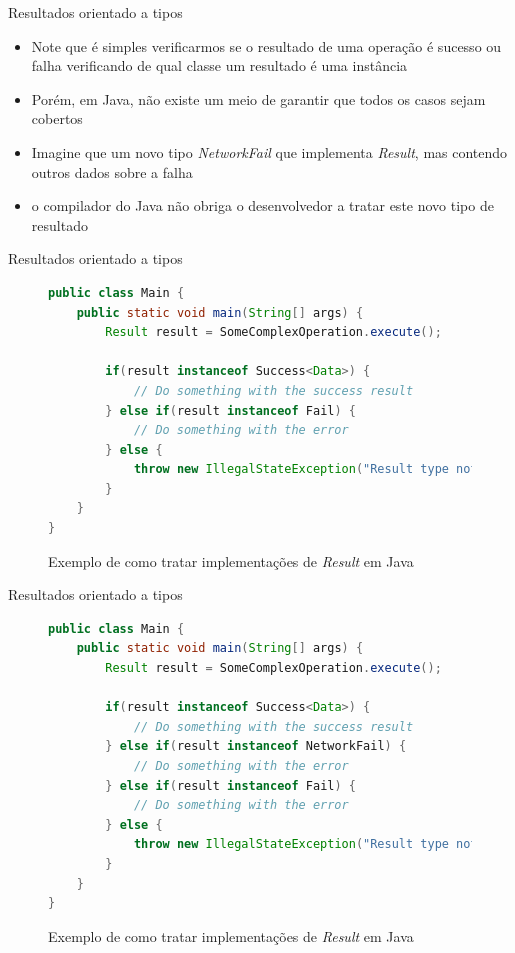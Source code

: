 \documentclass[brazilian]{beamer}
\begin{document}
\begin{frame}{Resultados orientado a tipos}
    \begin{itemize}
        \item Note que é simples verificarmos se o resultado de uma operação é sucesso ou falha verificando de qual classe um resultado é uma instância
        \item Porém, em Java, não existe um meio de garantir que todos os casos sejam cobertos
        \item Imagine que um novo tipo \emph{NetworkFail} que implementa \emph{Result}, mas contendo outros dados sobre a falha
        \item o compilador do Java não obriga o desenvolvedor a tratar este novo tipo de resultado
    \end{itemize}
\end{frame}

\begin{frame}[fragile]{Resultados orientado a tipos}
    \begin{figure}[H]
        \centering
        \begin{lstlisting}[language=Java]
public class Main {
    public static void main(String[] args) {
        Result result = SomeComplexOperation.execute();
        
        if(result instanceof Success<Data>) {
            // Do something with the success result
        } else if(result instanceof Fail) {
            // Do something with the error
        } else {
            throw new IllegalStateException("Result type not implemented")
        }
    }
}
        \end{lstlisting}
        \caption{Exemplo de como tratar implementações de \emph{Result} em Java}
        \label{fig:java_if_else_statements}
    \end{figure}
\end{frame}

\begin{frame}[fragile]{Resultados orientado a tipos}
    \begin{figure}[H]
        \centering
        \begin{lstlisting}[language=Java]
public class Main {
    public static void main(String[] args) {
        Result result = SomeComplexOperation.execute();
        
        if(result instanceof Success<Data>) {
            // Do something with the success result
        } else if(result instanceof NetworkFail) {
            // Do something with the error
        } else if(result instanceof Fail) {
            // Do something with the error
        } else {
            throw new IllegalStateException("Result type not implemented")
        }
    }
}
        \end{lstlisting}
        \caption{Exemplo de como tratar implementações de \emph{Result} em Java}
        \label{fig:java_if_else_statements_with_new_type}
    \end{figure}
\end{frame}
\end{document}
